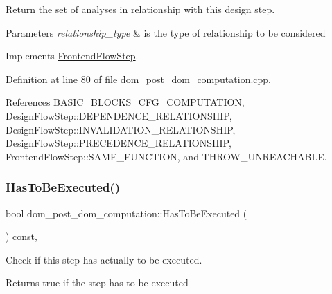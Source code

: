 Return the set of analyses in relationship with this design step. 


\begin{DoxyParams}{Parameters}
{\em relationship\+\_\+type} & is the type of relationship to be considered \\
\hline
\end{DoxyParams}


Implements \hyperlink{classFrontendFlowStep_abeaff70b59734e462d347ed343dd700d}{Frontend\+Flow\+Step}.



Definition at line 80 of file dom\+\_\+post\+\_\+dom\+\_\+computation.\+cpp.



References B\+A\+S\+I\+C\+\_\+\+B\+L\+O\+C\+K\+S\+\_\+\+C\+F\+G\+\_\+\+C\+O\+M\+P\+U\+T\+A\+T\+I\+ON, Design\+Flow\+Step\+::\+D\+E\+P\+E\+N\+D\+E\+N\+C\+E\+\_\+\+R\+E\+L\+A\+T\+I\+O\+N\+S\+H\+IP, Design\+Flow\+Step\+::\+I\+N\+V\+A\+L\+I\+D\+A\+T\+I\+O\+N\+\_\+\+R\+E\+L\+A\+T\+I\+O\+N\+S\+H\+IP, Design\+Flow\+Step\+::\+P\+R\+E\+C\+E\+D\+E\+N\+C\+E\+\_\+\+R\+E\+L\+A\+T\+I\+O\+N\+S\+H\+IP, Frontend\+Flow\+Step\+::\+S\+A\+M\+E\+\_\+\+F\+U\+N\+C\+T\+I\+ON, and T\+H\+R\+O\+W\+\_\+\+U\+N\+R\+E\+A\+C\+H\+A\+B\+LE.

\mbox{\label{classdom__post__dom__computation_a4b744602d67b99a29be3a61b769bad7a}} 
\subsubsection{\texorpdfstring{Has\+To\+Be\+Executed()}{HasToBeExecuted()}}
{\footnotesize\ttfamily bool dom\+\_\+post\+\_\+dom\+\_\+computation\+::\+Has\+To\+Be\+Executed (\begin{DoxyParamCaption}{ }\end{DoxyParamCaption}) const\hspace{0.3cm}{\ttfamily [override]}, {\ttfamily [virtual]}}



Check if this step has actually to be executed. 

\begin{DoxyReturn}{Returns}
true if the step has to be executed 
\end{DoxyReturn}


